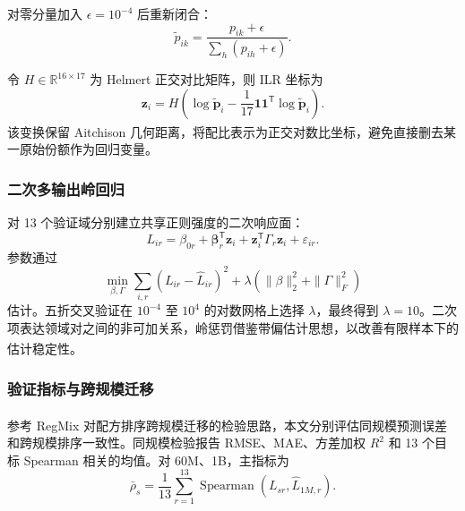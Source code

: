 \documentclass[bwprint]{gmcmthesis}
\begin{document}
        对零分量加入 $\epsilon=10^{-4}$ 后重新闭合：
        \begin{equation}
        \widetilde p_{ik}=\frac{p_{ik}+\epsilon}{\sum_h(p_{ih}+\epsilon)}.
        \label{eq:closure}
        \end{equation}
        
        令 $H\in\mathbb R^{16\times17}$ 为 Helmert 正交对比矩阵，则 ILR 坐标为
        \begin{equation}
        \bm z_i=H\left(\log\widetilde{\bm p}_i-
        \frac1{17}\bm 1\bm 1^{\mathsf T}\log\widetilde{\bm p}_i\right).
        \label{eq:ilr}
        \end{equation}
        该变换保留 Aitchison 几何距离，将配比表示为正交对数比坐标\textsuperscript{\cite{egozcue2003ilr}}，避免直接删去某一原始份额作为回归变量。

        
        \subsubsection{二次多输出岭回归}    %
        对 13 个验证域分别建立共享正则强度的二次响应面：
        \begin{equation}
        L_{ir}=\beta_{0r}+\bm\beta_r^{\mathsf T}\bm z_i
        +\bm z_i^{\mathsf T}\Gamma_r\bm z_i+\varepsilon_{ir}.
        \label{eq:ridge}
        \end{equation}
        参数通过
        \begin{equation}
        \min_{\beta,\Gamma}\sum_{i,r}(L_{ir}-\widehat L_{ir})^2
        +\lambda\left(\|\beta\|_2^2+\|\Gamma\|_F^2\right)
        \label{eq:ridgeobjective}
        \end{equation}
        估计。五折交叉验证在 $10^{-4}$ 至 $10^4$ 的对数网格上选择 $\lambda$，最终得到 $\lambda=10$。二次项表达领域对之间的非可加关系，岭惩罚借鉴带偏估计思想，以改善有限样本下的估计稳定性\textsuperscript{\cite{hoerl1970ridge}}。

        
        \subsubsection{验证指标与跨规模迁移}  %
        参考 RegMix 对配方排序跨规模迁移的检验思路\textsuperscript{\cite{liu2025regmix}}，本文分别评估同规模预测误差和跨规模排序一致性。同规模检验报告 RMSE、MAE、方差加权 $R^2$ 和 13 个目标 Spearman 相关的均值。对 60M、1B，主指标为
        \begin{equation}
        \bar\rho_s=\frac1{13}\sum_{r=1}^{13}
        \operatorname{Spearman}(L_{sr},\widehat L_{1M,r}).
        \label{eq:spearman}
        \end{equation}
        
\end{document}
